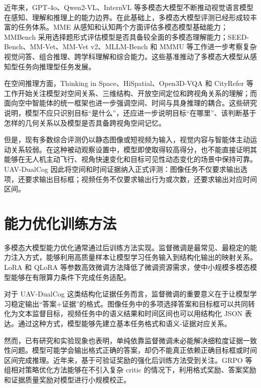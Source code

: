 近年来，GPT-4o、Qwen2-VL、InternVL 等多模态大模型不断推动视觉语言模型在感知、理解和推理上的能力边界\cite{hurst2024gpt4o,wang2024qwen2vl,wang2025internvl3_5}。在此基础上，多模态大模型评测已经形成较丰富的任务体系。MME 从感知和认知两个方面评估多模态模型基础能力\cite{fu2023mme}；MMBench 采用选择题形式评估模型是否具备较全面的多模态理解能力\cite{liu2024mmbench}；SEED-Bench、MM-Vet、MM-Vet v2、MLLM-Bench 和 MMMU 等工作进一步考察复杂视觉问答、组合推理、跨学科理解和综合能力\cite{li2024seed,yu2023mmvet,yu2024mmvet2,ge2025mllm,yue2024mmmu}。这些基准推动了多模态大模型从感知型任务向推理型任务发展。

在空间推理方面，Thinking in Space、HiSpatial、Open3D-VQA 和 CityRefer 等工作开始关注模型对空间关系、三维结构、开放空间定位和跨视角关系的理解\cite{yang2025thinking,liang2026hispatial,zhang2025open3d,miyanishi2023cityrefer}；而面向空中智能体的统一框架也进一步强调空间、时间与具身推理的耦合\cite{xu2025aerial,yang2026vision}。这些研究说明，模型不应只识别目标“是什么”，还应进一步说明目标“在哪里”、该判断基于怎样的几何关系以及模型是否具备跨视角空间记忆。

但是，现有多数综合评测仍以静态图像或短视频为输入，视觉内容与智能体主动运动关系较弱。在这种被动观察设置中，模型即使取得较高得分，也不能直接证明其能够在无人机主动飞行、视角快速变化和目标可见性动态变化的场景中保持可靠。UAV-DualCog 因此将空间和时间证据纳入正式评测：图像任务不仅要求输出选项，还要求输出目标框；视频任务不仅要求输出行为或次数，还要求输出对应时间区间。

\section{能力优化训练方法}

多模态大模型能力优化通常通过后训练方法实现。监督微调是最常见、最稳定的能力注入方式，能够利用高质量样本让模型学习任务输入到结构化输出的映射关系。LoRA 和 QLoRA 等参数高效微调方法降低了微调资源需求，使中小规模多模态模型能够在有限算力条件下完成任务适配\cite{hu2021lora,dettmers2023qlora,han2024peft}。

对于 UAV-DualCog 这类结构化证据任务而言，监督微调的重要意义在于让模型学习稳定输出“答案+证据”的格式。图像任务中的多项选择答案和目标框可以共同转化为文本监督目标，视频任务中的语义结果和时间区间也可以用结构化 JSON 表达。通过这种方式，模型能够先建立基本任务格式和语义-证据对应关系。

然而，已有研究和实验现象也表明，单纯依靠监督微调未必能解决细粒度证据一致性问题。模型可能学会输出格式正确的答案，却仍不能真正依赖正确目标框或时间区间完成推理。近年来，基于可验证奖励的强化后训练方法受到关注。GRPO 等组相对策略优化方法能够在不引入复杂 critic 的情况下，利用格式奖励、答案奖励和证据质量奖励对模型进行小规模校正\cite{shao2024deepseekmath,wen2025verifiable}。

